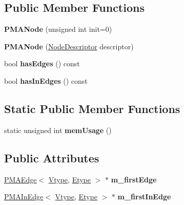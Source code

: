 \subsection*{Public Member Functions}
\begin{DoxyCompactItemize}
\item 
\hypertarget{class_p_m_a_node_a3f48da62f832f43d5abe0c781c8f887e}{
{\bfseries PMANode} (unsigned int init=0)}
\label{class_p_m_a_node_a3f48da62f832f43d5abe0c781c8f887e}

\item 
\hypertarget{class_p_m_a_node_abd4e2ad2d33d3c05294bac31de138d92}{
{\bfseries PMANode} (\hyperlink{class_p_m_a_node}{NodeDescriptor} descriptor)}
\label{class_p_m_a_node_abd4e2ad2d33d3c05294bac31de138d92}

\item 
\hypertarget{class_p_m_a_node_a2b85ad9c78075197ee2fe0d9824505dd}{
bool {\bfseries hasEdges} () const }
\label{class_p_m_a_node_a2b85ad9c78075197ee2fe0d9824505dd}

\item 
\hypertarget{class_p_m_a_node_ababc42852891655802ec3d397023547f}{
bool {\bfseries hasInEdges} () const }
\label{class_p_m_a_node_ababc42852891655802ec3d397023547f}

\end{DoxyCompactItemize}
\subsection*{Static Public Member Functions}
\begin{DoxyCompactItemize}
\item 
\hypertarget{class_p_m_a_node_a7f912def0da113a09373f2430e550052}{
static unsigned int {\bfseries memUsage} ()}
\label{class_p_m_a_node_a7f912def0da113a09373f2430e550052}

\end{DoxyCompactItemize}
\subsection*{Public Attributes}
\begin{DoxyCompactItemize}
\item 
\hypertarget{class_p_m_a_node_a4a22c4128dec18b6e393409ad930af39}{
\hyperlink{class_p_m_a_edge}{PMAEdge}$<$ \hyperlink{class_vtype}{Vtype}, \hyperlink{class_etype}{Etype} $>$ $\ast$ {\bfseries m\_\-firstEdge}}
\label{class_p_m_a_node_a4a22c4128dec18b6e393409ad930af39}

\item 
\hypertarget{class_p_m_a_node_a7abff38c195ac81f92359f40732e27e7}{
\hyperlink{class_p_m_a_in_edge}{PMAInEdge}$<$ \hyperlink{class_vtype}{Vtype}, \hyperlink{class_etype}{Etype} $>$ $\ast$ {\bfseries m\_\-firstInEdge}}
\label{class_p_m_a_node_a7abff38c195ac81f92359f40732e27e7}

\end{DoxyCompactItemize}
